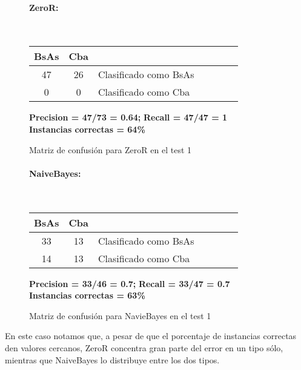 \begin{figure}[H]
\centering
\paragraph*{ZeroR:}\mbox{}\\
\begin{table}[H]
\centering
\begin{tabular}{|c|c|l|c|c|c|c|}
\hline
 BsAs & Cba &  \\ \hline
 47 &  26 &  Clasificado como BsAs \\ \hline
 0 &  0 &  Clasificado como Cba \\ \hline
\end{tabular}
\end{table}
\begin{center}
\textbf{Precision = 47/73 = 0.64;} \textbf{Recall = 47/47 = 1}\\
\textbf{Instancias correctas = 64\%}
\end{center}
\caption{Matriz de confusión para ZeroR en el test 1}
\label{ZeroR_matrizconf_2}
\end{figure}

\begin{figure}[H]
\centering
\paragraph*{NaiveBayes:}\mbox{}\\
\begin{table}[H]
\centering
\begin{tabular}{|c|c|l|c|c|c|c|}
\hline
 BsAs & Cba &  \\ \hline
 33 &  13 &  Clasificado como BsAs \\ \hline
 14 &  13 &  Clasificado como Cba \\ \hline
\end{tabular}
\end{table}
\begin{center}
\textbf{Precision = 33/46 = 0.7;} \textbf{Recall = 33/47 = 0.7}\\
\textbf{Instancias correctas = 63\%}
\end{center}
\caption{Matriz de confusión para NavieBayes en el test 1}
\label{NaiveBayes_matrizconf_2}
\end{figure}

En este caso notamos que, a pesar de que el porcentaje de instancias correctas den valores cercanos, ZeroR concentra gran parte del error en un tipo sólo, mientras que NaiveBayes lo distribuye entre los dos tipos.

